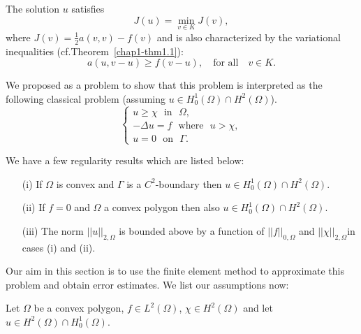 The solution $u$ satisfies
\begin{equation*}
J(u)=\min\limits_{v\in K}J(v),\tag{9.2}\label{chap9-eq9.2}
\end{equation*}
where $J(v)=\frac{1}{2}a(v,v)-f(v)$ and is also characterized by the
variational inequalities (cf.\@ Theorem~\ref{chap1-thm1.1}):
\begin{equation*}
a(u,v-u)\geq f(v-u),\quad\text{for all}\quad v\in
K.\tag{9.3}\label{chap9-eq9.3} 
\end{equation*}

We proposed as a problem to show that this problem is interpreted as
the following classical problem (assuming $u\in H^{1}_{0}(\Omega)\cap
H^{2}(\Omega)$). 
\begin{equation*}
\begin{cases}
u\geq \chi\text{~ in~ }\Omega,\\
-\Delta u=f\text{~ where~ }u>\chi,\\
u=0\text{~ on~ }\Gamma.
\end{cases}\tag{9.4}\label{chap9-eq9.4}
\end{equation*}

We have a few regularity results which are listed below:
\begin{itemize}
\item[(i)] If $\Omega$ is convex and $\Gamma$ is a $C^{2}$-boundary
  then $u\in H^{1}_{0}(\Omega)\cap H^{2}(\Omega)$.

\item[(ii)] If $f=0$ and $\Omega$ a convex polygon then also $u\in
  H^{1}_{0}(\Omega)\cap H^{2}(\Omega)$.

\item[(iii)] The norm $||u||_{2,\Omega}$ is bounded above by a
  function of $||f||_{0,\Omega}$ and
  $||\chi||_{2,\Omega}$\pageoriginale in cases (i) and (ii).
\end{itemize}

Our aim in this section is to use the finite element method to
approximate this problem and obtain error estimates. We list our
assumptions now:

Let $\Omega$ be a convex polygon, $f\in L^{2}(\Omega)$, $\chi\in
H^{2}(\Omega)$ and let $u\in H^{2}(\Omega)\cap H^{1}_{0}(\Omega)$.

